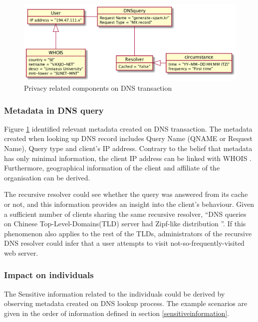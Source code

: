 \begin{figure}[ht!]
    \begin{center}
        \includegraphics*[width=\columnwidth]{img/privacyobject}
    \end{center}
    \caption{Privacy related components on DNS transaction}
    \label{privacyobject}
\end{figure}

\subsubsection{Metadata in DNS query}\label{dnsmetadata}
Figure \ref{privacyobject} identified relevant metadata created on DNS transaction.
The metadata created when looking up DNS record includes Query Name (QNAME or Request Name), Query type and client's IP address.
Contrary to the belief that metadata has only minimal information, the client IP address can be linked with WHOIS \cite{whois-icann}. Furthermore, geographical information of the client and affiliate of the organisation can be derived.

The recursive resolver could see whether the query was answered from its cache or not, and this information provides an insight into the client's behaviour.
Given a sufficient number of clients sharing the same recursive resolver, ``DNS queries on Chinese Top-Level-Domains(TLD) server had Zipf-like distribution \cite{wang2013analysis}''. If this phenomenon also applies to the rest of the TLDs, administrators of the recursive DNS resolver could infer that a user attempts to visit not-so-frequently-visited web server.

\subsubsection{Impact on individuals}
The Sensitive information related to the individuals could be derived by observing metadata created on DNS lookup process. The example scenarios are given in the order of information defined in section \ref{sensitiveinformation}.

